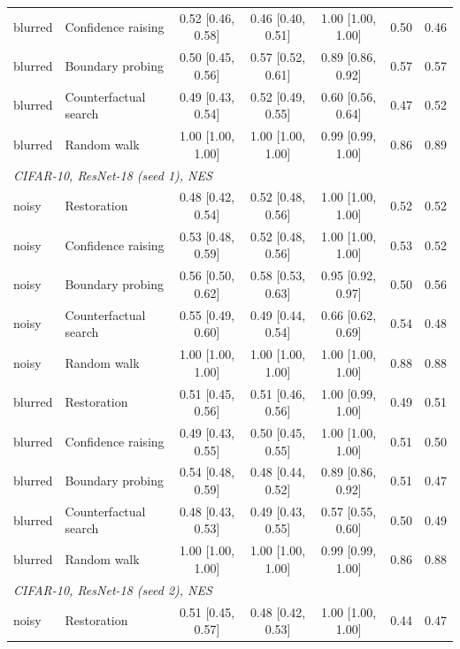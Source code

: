 \begin{landscape}
\begin{footnotesize}
\begin{longtable}{@{\extracolsep{\fill}}llccccc@{}}
\quad blurred & Confidence raising & 0.52 {[}0.46, 0.58{]} & 0.46 {[}0.40, 0.51{]} & 1.00 {[}1.00, 1.00{]} & 0.50 & 0.46 \\
\quad blurred & Boundary probing & 0.50 {[}0.45, 0.56{]} & 0.57 {[}0.52, 0.61{]} & 0.89 {[}0.86, 0.92{]} & 0.57 & 0.57 \\
\quad blurred & Counterfactual search & 0.49 {[}0.43, 0.54{]} & 0.52 {[}0.49, 0.55{]} & 0.60 {[}0.56, 0.64{]} & 0.47 & 0.52 \\
\quad blurred & Random walk & 1.00 {[}1.00, 1.00{]} & 1.00 {[}1.00, 1.00{]} & 0.99 {[}0.99, 1.00{]} & 0.86 & 0.89 \\
\multicolumn{7}{l}{\emph{CIFAR-10, ResNet-18 (seed 1), NES}} \\
\quad noisy & Restoration & 0.48 {[}0.42, 0.54{]} & 0.52 {[}0.48, 0.56{]} & 1.00 {[}1.00, 1.00{]} & 0.52 & 0.52 \\
\quad noisy & Confidence raising & 0.53 {[}0.48, 0.59{]} & 0.52 {[}0.48, 0.56{]} & 1.00 {[}1.00, 1.00{]} & 0.53 & 0.52 \\
\quad noisy & Boundary probing & 0.56 {[}0.50, 0.62{]} & 0.58 {[}0.53, 0.63{]} & 0.95 {[}0.92, 0.97{]} & 0.50 & 0.56 \\
\quad noisy & Counterfactual search & 0.55 {[}0.49, 0.60{]} & 0.49 {[}0.44, 0.54{]} & 0.66 {[}0.62, 0.69{]} & 0.54 & 0.48 \\
\quad noisy & Random walk & 1.00 {[}1.00, 1.00{]} & 1.00 {[}1.00, 1.00{]} & 1.00 {[}1.00, 1.00{]} & 0.88 & 0.88 \\
\quad blurred & Restoration & 0.51 {[}0.45, 0.56{]} & 0.51 {[}0.46, 0.56{]} & 1.00 {[}0.99, 1.00{]} & 0.49 & 0.51 \\
\quad blurred & Confidence raising & 0.49 {[}0.43, 0.55{]} & 0.50 {[}0.45, 0.55{]} & 1.00 {[}1.00, 1.00{]} & 0.51 & 0.50 \\
\quad blurred & Boundary probing & 0.54 {[}0.48, 0.59{]} & 0.48 {[}0.44, 0.52{]} & 0.89 {[}0.86, 0.92{]} & 0.51 & 0.47 \\
\quad blurred & Counterfactual search & 0.48 {[}0.43, 0.53{]} & 0.49 {[}0.43, 0.55{]} & 0.57 {[}0.55, 0.60{]} & 0.50 & 0.49 \\
\quad blurred & Random walk & 1.00 {[}1.00, 1.00{]} & 1.00 {[}1.00, 1.00{]} & 0.99 {[}0.99, 1.00{]} & 0.86 & 0.88 \\
\multicolumn{7}{l}{\emph{CIFAR-10, ResNet-18 (seed 2), NES}} \\
\quad noisy & Restoration & 0.51 {[}0.45, 0.57{]} & 0.48 {[}0.42, 0.53{]} & 1.00 {[}1.00, 1.00{]} & 0.44 & 0.47 \\

\end{longtable}
\end{footnotesize}
\end{landscape}
